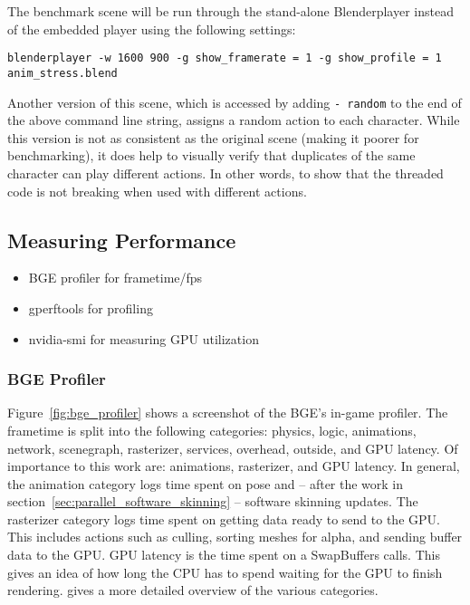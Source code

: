 
The benchmark scene will be run through the stand-alone Blenderplayer instead of the embedded player using the following settings:
\begin{verbatim}
blenderplayer -w 1600 900 -g show_framerate = 1 -g show_profile = 1 anim_stress.blend
\end{verbatim}

Another version of this scene, which is accessed by adding \texttt{- random} to the end of the above command line string, assigns a random action to each character.
While this version is not as consistent as the original scene (making it poorer for benchmarking), it does help to visually verify that duplicates of the same character can play different actions.
In other words, to show that the threaded code is not breaking when used with different actions.

\subsection{Measuring Performance}
\ifsummaries
\begin{itemize}
 \item BGE profiler for frametime/fps
 \item gperftools for profiling
 \item nvidia-smi for measuring GPU utilization
\end{itemize}
\fi

\subsubsection{BGE Profiler}

Figure~\ref{fig:bge_profiler} shows a screenshot of the BGE's in-game profiler.
The frametime is split into the following categories: physics, logic, animations, network, scenegraph, rasterizer, services, overhead, outside, and GPU latency.
Of importance to this work are: animations, rasterizer, and GPU latency.
In general, the animation category logs time spent on pose and -- after the work in section~\ref{sec:parallel_software_skinning} -- software skinning updates.
The rasterizer category logs time spent on getting data ready to send to the GPU.
This includes actions such as culling, sorting meshes for alpha, and sending buffer data to the GPU.
GPU latency is the time spent on a SwapBuffers calls.
This gives an idea of how long the CPU has to spend waiting for the GPU to finish rendering.
\cite{bge_profile_stats} gives a more detailed overview of the various categories.


